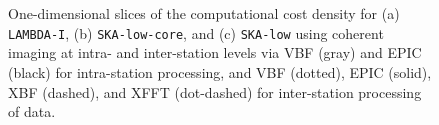 \documentclass[
  journal=pasa,
  manuscript=article-type,
  year=2020,
  volume=37,
]{cup-journal}
\begin{document}
\begin{figure}
\centering
{} \\
 \\
\caption{One-dimensional slices of the computational cost density for (a) \texttt{LAMBDA-I}, (b) \texttt{SKA-low-core}, and (c) \texttt{SKA-low} using  coherent imaging at intra- and inter-station levels via VBF (gray) and EPIC (black) for intra-station processing, and VBF (dotted), EPIC (solid), XBF (dashed), and XFFT (dot-dashed) for inter-station processing of data. \label{fig:1D-incoherent-compcost-a}}
\end{figure}
\end{document}
